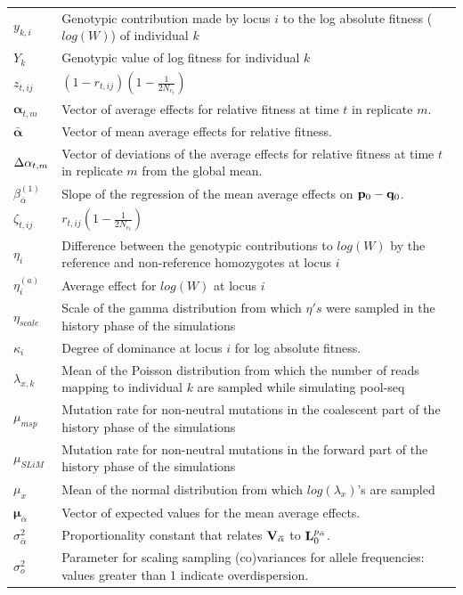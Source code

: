 \documentclass[12pt]{article}
\begin{document}
\begin{longtable}{|p{2cm}|p{13cm}|}
${y_{k,i}}$&Genotypic contribution made by locus $i$ to the log absolute fitness ($log(W)$) of individual $k$\\
$Y_k$&Genotypic value of log fitness for individual $k$\\
$z_{t,ij}$&$(1-r_{t,ij})(1-\frac{1}{2N_{e_t}})$\\
$\boldsymbol{\alpha}_{t,m}$& Vector of average effects for relative fitness at time $t$ in replicate $m$.\\
$\bar{\boldsymbol{\alpha}}$& Vector of mean average effects for relative fitness.\\
$\Delta{\bf \alpha}_{t,m}$&Vector of deviations of the average effects for relative fitness at time $t$ in replicate $m$ from the global mean.\\
$\beta^{(1)}_{\bar{\alpha}}$&Slope of the regression of the mean average effects on ${\bf p}_0 - {\bf q}_0$.\\
$\zeta_{t,ij}$&$r_{t,ij}(1-\frac{1}{2N_{e_t}})$\\
$\eta_{i}$& Difference between the genotypic contributions to $log(W)$ by the reference and non-reference homozygotes at locus $i$\\
$\eta_i^{(a)}$&Average effect for $log(W)$ at locus $i$\\
$\eta_{scale}$&Scale of the gamma distribution from which $\eta's$ were sampled in the history phase of the simulations\\
$\kappa_i$&Degree of dominance at locus $i$ for log absolute fitness. \\
$\lambda_{x,k}$&Mean of the Poisson distribution from which the number of reads mapping to individual $k$ are sampled while simulating pool-seq \\
$\mu_{msp}$&Mutation rate for non-neutral mutations in the coalescent part of the history phase of the simulations\\
$\mu_{SLiM}$& Mutation rate for non-neutral mutations in the forward part of the history phase of the simulations\\
$\mu_x$&Mean of the normal distribution from which $log(\lambda_{x})$'s are sampled\\
$\boldsymbol{\mu}_{\bar{\alpha}}$&Vector of expected values for the mean average effects.\\
$\sigma^{2}_{\bar{\alpha}}$&Proportionality constant that relates $\bf{V}_{\bar{\alpha}}$ to ${\bf L}_{0}^{p_{\bar{\alpha}}}$.\\
$\sigma^2_o$& Parameter for scaling sampling (co)variances for allele frequencies: values greater than 1 indicate overdispersion.\\

\end{longtable}
\end{document}
